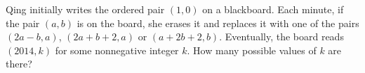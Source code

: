 Qing initially writes the ordered pair $(1,0)$ on a blackboard. Each minute, if the pair $(a,b)$ is on the board, she erases it and replaces it with one of the pairs $(2a-b,a)$, $(2a+b+2,a)$ or $(a+2b+2,b)$.  Eventually, the board reads $(2014,k)$ for some nonnegative integer $k$.  How many possible values of $k$ are there?

